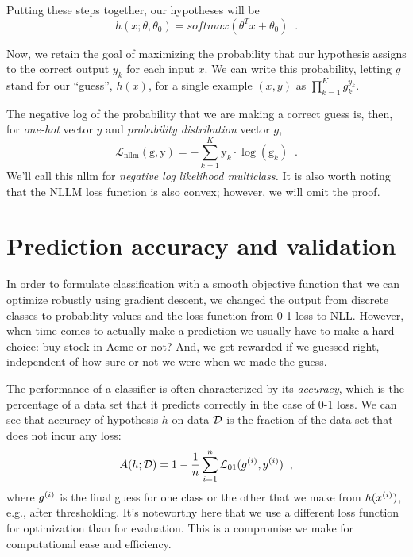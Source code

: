   Putting these steps together, our hypotheses will be
  \[h(x; \theta, \theta_0) = \textit{softmax}(\theta^T x + \theta_0)\;\;.\]

  Now, we retain the goal of maximizing the probability that our
  hypothesis assigns to the correct output $y_k$ for each input $x$.  We
  can write this probability, letting $g$ stand for our ``guess'', $h(x)$, for a
  single example $(x, y)$ as $\prod_{k = 1}^K g_k^{y_k}$.

  The negative log of the probability that we are making a correct guess is, then, for {\em one-hot} vector $y$ and {\em probability distribution}
  vector $g$,
$$\mathcal{L}_\text{nllm}(\text{g},\text{y}) =
  - \sum_{k=1}^K \text{y}_k \cdot \log(\text{g}_k) \;\;.$$
We'll call this {\sc nllm} for {\em negative log likelihood
    multiclass.} It is also worth noting that the NLLM loss function is also convex; however, we will omit the proof.

\section{Prediction accuracy and validation}

In order to formulate classification with a smooth objective function
that we can optimize robustly using gradient descent, we changed the
output from discrete classes to probability values and the loss
function from 0-1 loss to NLL.
However, when time comes to actually make a prediction we usually have
to make a hard choice:  buy stock in Acme or not?  And, we get
rewarded if we guessed right, independent of how sure or not we were
when we made the guess.

The performance of a classifier is often characterized by its {\em
    accuracy}, which is the percentage of a data set that it predicts
correctly in the case of 0-1 loss. We can see that accuracy of hypothesis $h$ on data ${\cal D}$
is the fraction of the data set that does not incur any loss:
\[A(h; {\cal D}) = 1 - \frac{1}{n}\sum_{i=1}^n\mathcal{L}_{01}(g^{(i)}, y^{(i)})\;\;,\]
where $g^{(i)}$ is the final guess for one class or the other
that we make from $h(x^{(i)})$, e.g., after thresholding.
It's noteworthy here that we use a different loss function for optimization
than for evaluation. This is a compromise we make for computational
ease and efficiency.





